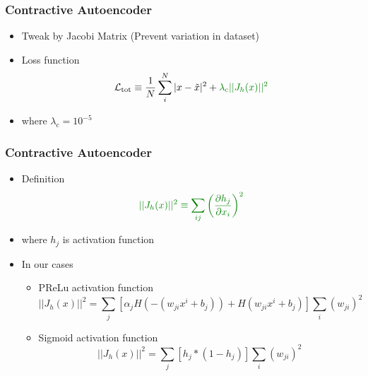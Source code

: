 \documentclass{beamer}
\begin{document}
\begin{frame}
\frametitle{Contractive Autoencoder}

\begin{itemize}
    \item Tweak by \textcolor[RGB]{0,128,0}{Jacobi Matrix (Prevent variation in dataset)}
    \item Loss function
    \begin{equation}
        \mathcal{L}_{\text{tot}} \equiv \frac{1}{N}\sum_i^N |x-\tilde{x}|^2 + \textcolor[RGB]{0,128,0}{\lambda_{\text{c}}||J_h(x)||^2}
    \end{equation}
    \item where $\lambda_{\text{c}} = 10^{-5}$
\end{itemize}
\end{frame}
\begin{frame}
\frametitle{Contractive Autoencoder}
\begin{itemize}
    \item Definition
    \begin{equation}
        \textcolor[RGB]{0,128,0}{||J_h(x)||^2 \equiv \sum_{ij}\left(\frac{\partial h_j}{\partial x_i}\right)^2}
    \end{equation}
    \item where $h_j$ is activation function
    \item In our cases
    \begin{itemize}
        \item PReLu activation function
        \begin{equation}
            ||J_h(x)||^2 = \sum_j[\alpha_jH(-(w_{ji}x^i+b_j)) + H(w_{ji}x^i+b_j)]\sum_i(w_{ji})^2
        \end{equation}
        \item Sigmoid activation function
        \begin{equation}
            ||J_h(x)||^2 = \sum_j[h_j*(1-h_j)]\sum_i(w_{ji})^2
        \end{equation}
    \end{itemize}
\end{itemize}

\end{frame}
\end{document}
